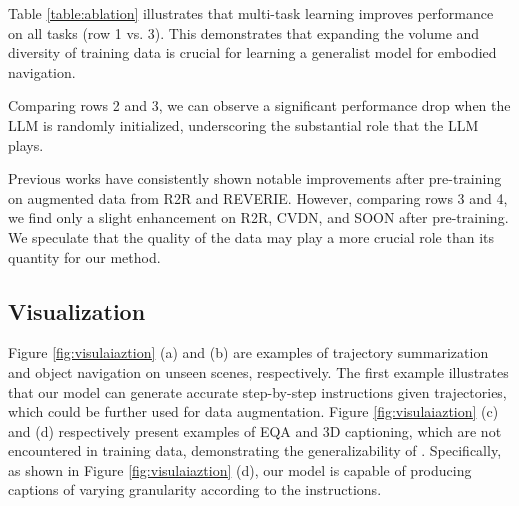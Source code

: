 Table \ref{table:ablation} illustrates that multi-task learning improves performance on all tasks (row 1 vs. 3).
This demonstrates that expanding the volume and diversity of training data is crucial for learning a generalist model for embodied navigation.

Comparing rows 2 and 3, we can observe a significant performance drop when the LLM is randomly initialized, underscoring the substantial role that the LLM plays.


Previous works \cite{Chen_2022_CVPR, Gao_2023_CVPR} have consistently shown notable improvements after pre-training on augmented data from R2R and REVERIE. 
However, comparing rows 3 and 4, we find only a slight enhancement on R2R, CVDN, and SOON after pre-training. 
We speculate that the quality of the data may play a more crucial role than its quantity for our method.

\subsection{Visualization}
\label{sec:visualization}
Figure \ref{fig:visulaiaztion} (a) and (b) are examples of trajectory summarization and object navigation on unseen scenes, respectively.
The first example illustrates that our model can generate accurate step-by-step instructions given trajectories, which could be further used for data augmentation.
Figure \ref{fig:visulaiaztion} (c) and (d) respectively present examples of EQA and 3D captioning, which are not encountered in training data, demonstrating the generalizability of \modelname.
Specifically, as shown in Figure \ref{fig:visulaiaztion} (d), our model is capable of producing captions of varying granularity according to the instructions.






